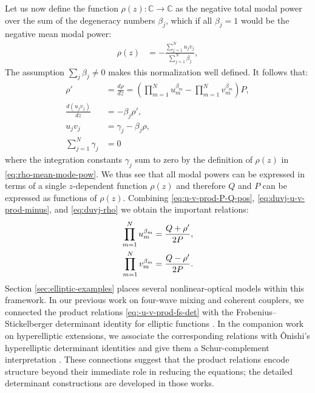 \documentclass[11pt,a4paper]{article}
\numberwithin{equation}{section}
\begin{document}
Let us now define the function $\rho(z) : \mathbb{C} \to \mathbb{C}$ as the negative total modal power over the sum of the degeneracy numbers $\beta_j$, which if all $\beta_j=1$ would be the negative mean modal power:
\begin{align}
    \rho(z) &= - \frac{\sum_{j=1}^{N}u_j v_j}{\sum_{j=1}^{N}\beta_j}, \label{eq:rho-mean-mode-pow}
\end{align}
The assumption $\sum_j\beta_j\ne0$ makes this normalization well defined. It follows that:
\begin{align}
    \rho' &= \frac{d \rho}{dz}  = \left(\prod_{m=1}^{N} u_{m}^{{\beta}_{m}} - \prod_{m=1}^{N} v_{m}^{{\beta}_{m}}\right) P, \label{eq:rho-prime-u-v-prod} \\
    \frac{d \left(u_j v_j\right)}{dz} &= -\beta_j \rho', \label{eq:duvj-rho} \\
    u_j v_j &= \gamma_j - \beta_j \rho, \label{eq:uvj-rho-gammaj} \\
    \sum_{j=1}^{N}\gamma_j &= 0
\end{align}
where the integration constants $\gamma_j$ sum to zero by the definition of $\rho(z)$ in \eqref{eq:rho-mean-mode-pow}. 
We thus see that all modal powers can be expressed in terms of a single $z$-dependent function $\rho(z)$ and therefore $Q$ and $P$ can be expressed as functions of $\rho(z)$.
Combining \eqref{eq:u-v-prod-P-Q-pos}, \eqref{eq:duvj-u-v-prod-minus}, and \eqref{eq:duvj-rho} we obtain the important relations:
\begin{align}
    \prod_{m=1}^{N} u_{m}^{{\beta}_{m}} &= \frac{Q + \rho'}{2P}, \notag \\
    \prod_{m=1}^{N} v_{m}^{{\beta}_{m}} &= \frac{Q - \rho'}{2P}. \label{eq:-u-v-prod-fs-det}
\end{align}
Section \ref{sec:elliptic-examples} places several nonlinear-optical models within this framework.
In our previous work on four-wave mixing and coherent couplers, we connected the product relations \eqref{eq:-u-v-prod-fs-det} with the Frobenius--Stickelberger determinant identity for elliptic functions \cite{heskethFWMWeierstrassElliptic2026,heskethCompleteWeierstrassElliptic2026}.
In the companion work on hyperelliptic extensions, we associate the corresponding relations with \^Onishi's hyperelliptic determinant identities and give them a Schur-complement interpretation \cite{zotero-item-855,onishiDETERMINANTEXPRESSIONSHYPERELLIPTIC2005}.
These connections suggest that the product relations encode structure beyond their immediate role in reducing the equations; the detailed determinant constructions are developed in those works.
\end{document}
